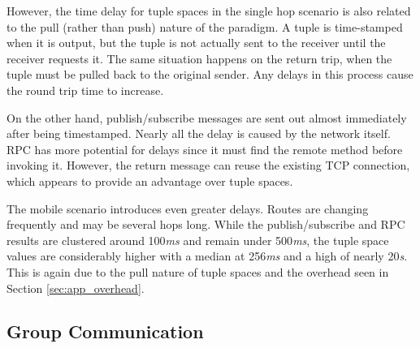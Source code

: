 \documentclass[lnicst]{svmultln}
\begin{document}
However, the time delay for tuple spaces in the single hop scenario is also related to the pull (rather than push) nature of the paradigm. A tuple is time-stamped when it is output, but the tuple is not actually sent to the receiver until the receiver requests it. The same situation happens on the return trip, when the tuple must be pulled back to the original sender. Any delays in this process cause the round trip time to increase.

On the other hand, publish/subscribe messages are sent out almost immediately after being timestamped. Nearly all the delay is caused by the network itself. RPC has more potential for delays since it must find the remote method before invoking it. However, the return message can reuse the existing TCP connection, which appears to provide an advantage over tuple spaces.


The mobile scenario introduces even greater delays. Routes are changing frequently and may be several hops long. While the publish/subscribe and RPC results are clustered around 100\textit{ms} and remain under 500\textit{ms}, the tuple space values are considerably higher with a median at 256\textit{ms} and a high of nearly 20\textit{s}. This is again due to the pull nature of tuple spaces and the overhead seen in Section \ref{sec:app_overhead}.

\subsection{Group Communication}
\end{document}
